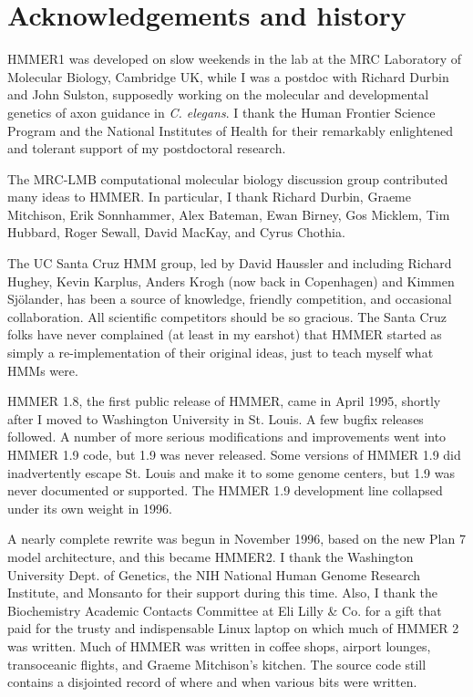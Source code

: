 \section{Acknowledgements and history}

HMMER1 was developed on slow weekends in the lab at the MRC Laboratory
of Molecular Biology, Cambridge UK, while I was a postdoc with Richard
Durbin and John Sulston, supposedly working on the molecular and
developmental genetics of axon guidance in \emph{C. elegans}.  I thank
the Human Frontier Science Program and the National Institutes of
Health for their remarkably enlightened and tolerant support of my
postdoctoral research.

The MRC-LMB computational molecular biology discussion group
contributed many ideas to HMMER. In particular, I thank Richard
Durbin, Graeme Mitchison, Erik Sonnhammer, Alex Bateman, Ewan Birney,
Gos Micklem, Tim Hubbard, Roger Sewall, David MacKay, and Cyrus
Chothia. 

The UC Santa Cruz HMM group, led by David Haussler and including
Richard Hughey, Kevin Karplus, Anders Krogh (now back in Copenhagen)
and Kimmen Sj\"{o}lander, has been a source of knowledge, friendly
competition, and occasional collaboration. All scientific competitors
should be so gracious. The Santa Cruz folks have never complained (at
least in my earshot) that HMMER started as simply a re-implementation
of their original ideas, just to teach myself what HMMs were.

HMMER 1.8, the first public release of HMMER, came in April 1995,
shortly after I moved to Washington University in St. Louis. A few
bugfix releases followed. A number of more serious modifications and
improvements went into HMMER 1.9 code, but 1.9 was never
released. Some versions of HMMER 1.9 did inadvertently escape
St. Louis and make it to some genome centers, but 1.9 was never
documented or supported. The HMMER 1.9 development line collapsed
under its own weight in 1996.

A nearly complete rewrite was begun in November 1996, based on the new
Plan 7 model architecture, and this became HMMER2. I thank the
Washington University Dept. of Genetics, the NIH National Human Genome
Research Institute, and Monsanto for their support during this time.
Also, I thank the Biochemistry Academic Contacts Committee at Eli
Lilly \& Co. for a gift that paid for the trusty and indispensable
Linux laptop on which much of HMMER 2 was written. Much of HMMER was
written in coffee shops, airport lounges, transoceanic flights, and
Graeme Mitchison's kitchen. The source code still contains a
disjointed record of where and when various bits were written.

